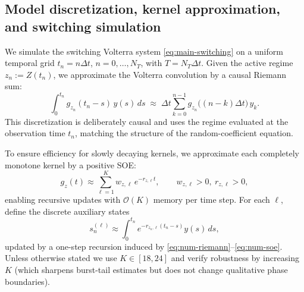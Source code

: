 \documentclass[12pt,a4paper]{article}
\theoremstyle{plain}
\theoremstyle{definition}
\theoremstyle{remark}
\begin{document}
\subsection{Model discretization, kernel approximation, and switching simulation}
\label{subsec:num-model}

We simulate the switching Volterra system \eqref{eq:main-switching} on a uniform temporal grid
$t_n=n\Delta t$, $n=0,\dots,N_T$, with $T=N_T\Delta t$.
Given the active regime $z_n:=Z(t_n)$, we approximate the Volterra convolution by a causal Riemann sum:
\begin{equation}
	\int_0^{t_n} g_{z_n}(t_n-s)\,y(s)\,ds
	\;\approx\;
	\Delta t \sum_{k=0}^{n-1} g_{z_n}\!\big((n-k)\Delta t\big)\,y_k.
	\label{eq:num-riemann}
\end{equation}
This discretization is deliberately causal and uses the regime evaluated at the observation time $t_n$, matching the structure of the
random-coefficient equation.

To ensure efficiency for slowly decaying kernels, we approximate each completely monotone kernel by a positive SOE:
\begin{equation}
	g_z(t)\approx \sum_{\ell=1}^{K} w_{z,\ell}\,e^{-r_{z,\ell}t},
	\qquad w_{z,\ell}>0,\ r_{z,\ell}>0,
	\label{eq:num-soe}
\end{equation}
enabling recursive updates with $\mathcal O(K)$ memory per time step.
For each $\ell$, define the discrete auxiliary states
\[
s^{(\ell)}_{n} \approx \int_0^{t_n} e^{-r_{z_n,\ell}(t_n-s)}y(s)\,ds,
\]
updated by a one-step recursion induced by \eqref{eq:num-riemann}--\eqref{eq:num-soe}.
Unless otherwise stated we use $K\in[18,24]$ and verify robustness by increasing $K$ (which sharpens burst-tail estimates but does not
change qualitative phase boundaries).
\end{document}
